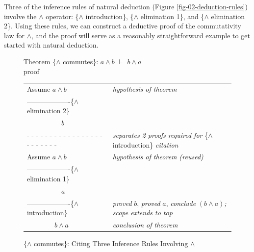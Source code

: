 Three of the inference rules of natural deduction
(Figure \ref{fig-02-deduction-rules})
involve the $\wedge$ operator:
\{$\wedge$ introduction\},
\{$\wedge$ elimination 1\}, and
\{$\wedge$ elimination 2\}.
Using these rules, we can construct a deductive proof
of the commutativity law for $\wedge$,
and the proof will serve as a reasonably straightforward
example to get started with natural deduction.

\begin{figure}
Theorem \{$\wedge$ commutes\}: $a \wedge b$ $\vdash$ $b \wedge a$ \\
proof
\begin{center}
\begin{tabular}{ll}
Assume $a \wedge b$                             &\emph{hypothesis of theorem}\\
-------------------\{$\wedge$ elimination 2\}   &\\
~~~~~~~~~~$b$                                   &\\
 - - - - - - - - - - - - - - - - - - - - - - - -&\emph{separates 2 proofs required for }\{$\wedge$ introduction\} \emph{citation}\\
Assume $a \wedge b$                             &\emph{hypothesis of theorem (reused)}\\
-------------------\{$\wedge$ elimination 1\}   &\\
~~~~~~~~~~$a$                                   &\\
-------------------\{$\wedge$ introduction\}    &\emph{proved} $b$, \emph{proved} $a$, \emph{conclude} $(b \wedge a)$\emph{; scope extends to top}\\
~~~~~~~~$b \wedge a$                            &\emph{conclusion of theorem}\\
\end{tabular}
\end{center}
\caption{\{$\wedge$ commutes\}: Citing Three Inference Rules Involving $\wedge$}
\label{fig:and-commutes-proof}
\end{figure}


